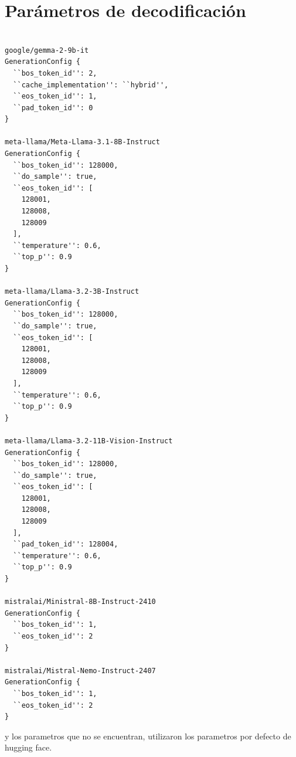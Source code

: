 \section{Parámetros de decodificación}\label{sec:parametros}

\begin{verbatim}

google/gemma-2-9b-it
GenerationConfig {
  ``bos_token_id'': 2,
  ``cache_implementation'': ``hybrid'',
  ``eos_token_id'': 1,
  ``pad_token_id'': 0
}

meta-llama/Meta-Llama-3.1-8B-Instruct
GenerationConfig {
  ``bos_token_id'': 128000,
  ``do_sample'': true,
  ``eos_token_id'': [
    128001,
    128008,
    128009
  ],
  ``temperature'': 0.6,
  ``top_p'': 0.9
}

meta-llama/Llama-3.2-3B-Instruct
GenerationConfig {
  ``bos_token_id'': 128000,
  ``do_sample'': true,
  ``eos_token_id'': [
    128001,
    128008,
    128009
  ],
  ``temperature'': 0.6,
  ``top_p'': 0.9
}

meta-llama/Llama-3.2-11B-Vision-Instruct
GenerationConfig {
  ``bos_token_id'': 128000,
  ``do_sample'': true,
  ``eos_token_id'': [
    128001,
    128008,
    128009
  ],
  ``pad_token_id'': 128004,
  ``temperature'': 0.6,
  ``top_p'': 0.9
}

mistralai/Ministral-8B-Instruct-2410
GenerationConfig {
  ``bos_token_id'': 1,
  ``eos_token_id'': 2
}

mistralai/Mistral-Nemo-Instruct-2407
GenerationConfig {
  ``bos_token_id'': 1,
  ``eos_token_id'': 2
}
\end{verbatim}


y los parametros que no se encuentran, utilizaron los parametros por defecto de hugging face.

